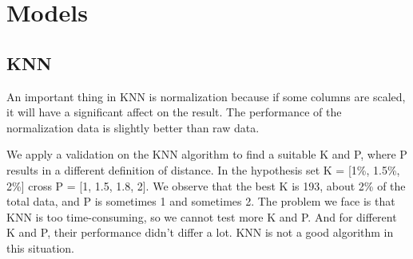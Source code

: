 \section{Models}
\subsection*{KNN}

\quad An important thing in KNN is normalization because if some columns are scaled, it will have a significant affect on the result. The performance of the normalization data is slightly better than raw data.

We apply a validation on the KNN algorithm to find a suitable K and P, where P results in a different definition of distance. In the hypothesis set K = [1\%, 1.5\%, 2\%] cross P = [1, 1.5, 1.8, 2]. We observe that the best K is 193, about 2\% of the total data, and P is sometimes 1 and sometimes 2. The problem we face is that KNN is too time-consuming, so we cannot test more K and P. And for different K and P, their performance didn't differ a lot. KNN is not a good algorithm in this situation.